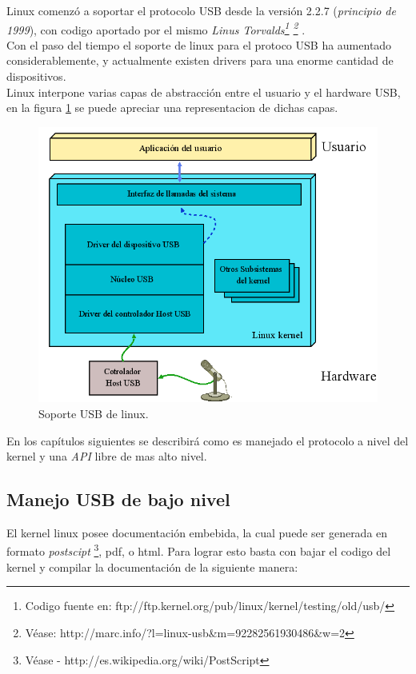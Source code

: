 Linux comenz\'o a soportar el protocolo USB desde la versi\'on 2.2.7
(\emph{principio de 1999}), con codigo aportado por el mismo \emph{Linus
Torvalds\footnote{Codigo fuente
en: ftp://ftp.kernel.org/pub/linux/kernel/testing/old/usb/}
\footnote{V\'ease:
http://marc.info/?l=linux-usb\&m=92282561930486\&w=2}
}.\\

Con el paso del tiempo el soporte de linux para el protoco USB ha aumentado
considerablemente, y actualmente existen drivers para una enorme cantidad de
dispositivos.\\

Linux interpone varias capas de abstracci\'on entre el usuario y el hardware
USB, en la figura \ref{fig:usb_linux_layers} se puede apreciar una
representacion de dichas capas.

\begin{figure}
\centering
\includegraphics[scale=0.5]{./img/usb_linux_layers.png}
\caption{Soporte USB de linux.}
\label{fig:usb_linux_layers}
\end{figure}


En los cap\'itulos siguientes se describir\'a como es
manejado el protocolo a nivel del kernel y una \emph{API} libre de mas alto
nivel.


\subsection{Manejo USB de bajo nivel}

El kernel linux posee documentaci\'on embebida, la cual puede ser generada en
formato \emph{postscipt} \footnote{V\'ease -
http://es.wikipedia.org/wiki/PostScript}, pdf, o html. Para lograr esto basta
con bajar el codigo del kernel y compilar la documentaci\'on de la siguiente
manera:


